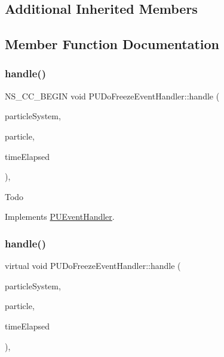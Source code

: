 \subsection*{Additional Inherited Members}


\subsection{Member Function Documentation}
\mbox{\label{classPUDoFreezeEventHandler_a0203ad7344e56fb7c6676222973da0cc}} 
\subsubsection{\texorpdfstring{handle()}{handle()}\hspace{0.1cm}{\footnotesize\ttfamily [1/2]}}
{\footnotesize\ttfamily N\+S\+\_\+\+C\+C\+\_\+\+B\+E\+G\+IN void P\+U\+Do\+Freeze\+Event\+Handler\+::handle (\begin{DoxyParamCaption}\item[{\hyperlink{classPUParticleSystem3D}{P\+U\+Particle\+System3D} $\ast$}]{particle\+System,  }\item[{\hyperlink{structPUParticle3D}{P\+U\+Particle3D} $\ast$}]{particle,  }\item[{float}]{time\+Elapsed }\end{DoxyParamCaption})\hspace{0.3cm}{\ttfamily [override]}, {\ttfamily [virtual]}}

Todo 

Implements \hyperlink{classPUEventHandler_a760172609708c65548dcac364c9b3b9c}{P\+U\+Event\+Handler}.

\mbox{\label{classPUDoFreezeEventHandler_a961d110b3aa250a3a2d9d95a049aa299}} 
\subsubsection{\texorpdfstring{handle()}{handle()}\hspace{0.1cm}{\footnotesize\ttfamily [2/2]}}
{\footnotesize\ttfamily virtual void P\+U\+Do\+Freeze\+Event\+Handler\+::handle (\begin{DoxyParamCaption}\item[{\hyperlink{classPUParticleSystem3D}{P\+U\+Particle\+System3D} $\ast$}]{particle\+System,  }\item[{\hyperlink{structPUParticle3D}{P\+U\+Particle3D} $\ast$}]{particle,  }\item[{float}]{time\+Elapsed }\end{DoxyParamCaption})\hspace{0.3cm}{\ttfamily [override]}, {\ttfamily [virtual]}}

